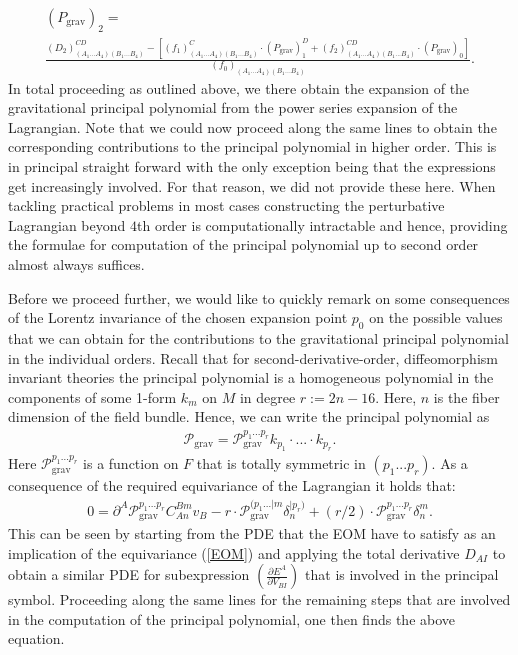 \begin{multline}\label{POLY3}
    (P_{\text{grav}})_2 = \\
    \frac{(D_2)^{CD}_{(A_1...A_4)(B_1...B_4)}-\left [ (f_1)^C_{(A_1...A_4)(B_1...B_4)} \cdot (P_{\text{grav}})^D_1  +(f_2)^{CD}_{(A_1...A_4)(B_1...B_4)} \cdot (P_{\text{grav}})_0 \right ]}{(f_0)_{(A_1...A_4)(B_1...B_4)}}.
\end{multline}
In total proceeding as outlined above, we there obtain the expansion of the gravitational principal polynomial from the power series expansion of the Lagrangian.
Note that we could now proceed along the same lines to obtain the corresponding contributions to the principal polynomial in higher order. This is in principal straight forward with the only exception being that the expressions get increasingly involved. For that reason, we did not provide these here. When tackling practical problems in most cases constructing the perturbative Lagrangian beyond $4$th order is computationally intractable and hence, providing the formulae for computation of the principal polynomial up to second order almost always suffices.

Before we proceed further, we would like to quickly remark on some consequences of the Lorentz invariance of the chosen expansion point $p_0$ on the possible values that we can obtain for the contributions to the gravitational principal polynomial in the individual orders. Recall that for second-derivative-order, diffeomorphism invariant theories the principal polynomial is a homogeneous polynomial in the components of some 1-form $k_m$ on $M$ in degree $r := 2n-16$. Here, $n$ is the fiber dimension of the field bundle. Hence, we can write the principal polynomial as
\begin{align}
    \mathcal{P}_{\text{grav}} = \mathcal{P}_{\text{grav}}^{{p_1}...{p_{r}}} k_{p_1} \cdot ... \cdot k_{p_r}.
\end{align}
Here $\mathcal{P}_{\text{grav}}^{{p_1}...{p_r}}$ is a function on $F$ that is totally symmetric in $(p_1...p_r)$. As a consequence of the required equivariance of the Lagrangian it holds that:
\begin{align}\label{polyEqn}
    0 = \partial^A\mathcal{P}_{\text{grav}}^{{p_1}...{p_r}}C_{An}^{Bm}v_B - r \cdot \mathcal{P}_{\text{grav}}^{({p_1}...\vert m} \delta_{n}^{\vert p_r) }  + (r/2) \cdot \mathcal{P}_{\text{grav}}^{{p_1}...{p_r}} \delta^m_n.
\end{align}
%
%
%
This can be seen by starting from the PDE that the EOM have to satisfy as an implication of the equivariance (\ref{EOM}) and applying the total derivative $D_{AI}$ to obtain a similar PDE for subexpression $\left ( \frac{\partial E^A}{\partial V_{BI}} \right )$ that is involved in the principal symbol. Proceeding along the same lines for the remaining steps that are involved in the computation of the principal polynomial, one then finds the above equation. 

